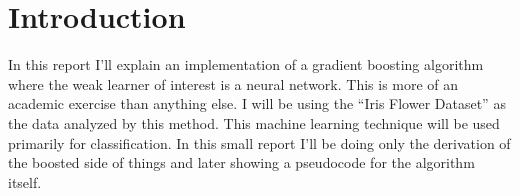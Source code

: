 \section*{Introduction}

In this report I'll explain an implementation of a gradient boosting algorithm where the weak learner of interest is a neural network. This is more of an academic exercise than anything else. I will be using the ``Iris Flower Dataset'' as the data analyzed by this method. This machine learning technique will be used primarily for classification. In this small report I'll be doing only the derivation of the boosted side of things and later showing a pseudocode for the algorithm itself.

